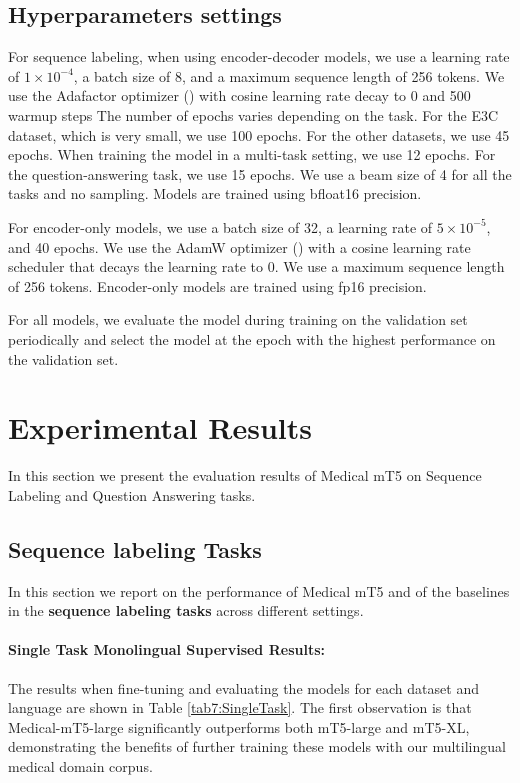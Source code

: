 \subsection{Hyperparameters settings}

For sequence labeling, when using encoder-decoder models, we use a learning rate of $1 \times 10^{-4}$, a batch size of 8, and a maximum sequence length of 256 tokens. We use the Adafactor optimizer (\cite{DBLP:conf/icml/ShazeerS18}) with cosine learning rate decay to 0 and 500 warmup steps The number of epochs varies depending on the task. For the E3C dataset, which is very small, we use 100 epochs. For the other datasets, we use 45 epochs. When training the model in a multi-task setting, we use 12 epochs. For the question-answering task, we use 15 epochs. We use a beam size of 4 for all the tasks and no sampling. Models are trained using bfloat16 precision.

For encoder-only models, we use a batch size of 32, a learning rate of $5 \times 10^{-5}$, and 40 epochs. We use the AdamW optimizer (\cite{DBLP:journals/corr/abs-1711-05101}) with a cosine learning rate scheduler that decays the learning rate to 0. We use a maximum sequence length of 256 tokens. Encoder-only models are trained using fp16 precision.

For all models, we evaluate the model during training on the validation set periodically and select the model at the epoch with the highest performance on the validation set.

\section{Experimental Results}
In this section we present the evaluation results of Medical mT5 on Sequence Labeling and Question Answering tasks.
\subsection{Sequence labeling Tasks}
In this section we report on the performance of Medical mT5 and of the baselines in the
\textbf{sequence labeling tasks} across different settings.


\paragraph{Single Task Monolingual Supervised Results:} The results when fine-tuning and evaluating the models for each dataset and language are shown in Table \ref{tab7:SingleTask}.  The first observation is that Medical-mT5-large significantly outperforms both mT5-large and mT5-XL, demonstrating the benefits of further training these models with our multilingual medical domain corpus.

